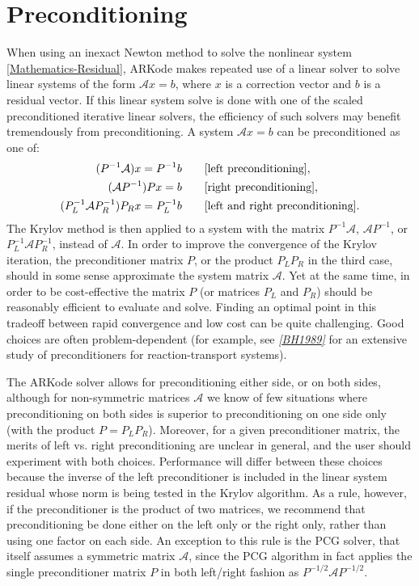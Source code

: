\documentclass[letterpaper,10pt,english]{sphinxmanual}
\begin{document}
\section{Preconditioning}
\label{Mathematics:mathematics-preconditioning}\label{Mathematics:preconditioning}
When using an inexact Newton method to solve the nonlinear system
\eqref{Mathematics-Residual}, ARKode makes repeated use of a linear solver to solve
linear systems of the form \({\mathcal A}x = b\), where \(x\) is a
correction vector and \(b\) is a residual vector.  If this linear
system solve is done with one of the scaled preconditioned iterative
linear solvers, the efficiency of such solvers may benefit
tremendously from preconditioning. A system \({\mathcal A}x=b\) can be
preconditioned as one of:
\begin{gather}
\begin{split}(P^{-1}{\mathcal A})x = P^{-1}b & \qquad\text{[left preconditioning]}, \\
({\mathcal A}P^{-1})Px = b  & \qquad\text{[right preconditioning]}, \\
(P_L^{-1} {\mathcal A} P_R^{-1}) P_R x = P_L^{-1}b & \qquad\text{[left and right
preconditioning]}.\end{split}\notag
\end{gather}
The Krylov method is then applied to a system with the
matrix \(P^{-1}{\mathcal A}\), \({\mathcal A}P^{-1}\), or
\(P_L^{-1} {\mathcal A} P_R^{-1}\), instead of \({\mathcal
A}\).  In order to improve the convergence of the Krylov iteration, the
preconditioner matrix \(P\), or the product \(P_L P_R\) in the
third case, should in some sense approximate the system matrix
\({\mathcal A}\).  Yet at the same time, in order to be
cost-effective the matrix \(P\) (or matrices \(P_L\) and
\(P_R\)) should be reasonably efficient to evaluate and solve.
Finding an optimal point in this tradeoff between rapid
convergence and low cost can be quite challenging.  Good choices are
often problem-dependent (for example, see \label{Mathematics:id6}{\hyperref[References:bh1989]{\emph{{[}BH1989{]}}}} for an
extensive study of preconditioners for reaction-transport systems).

The ARKode solver allows for preconditioning either side, or on both
sides, although for non-symmetric matrices \({\mathcal A}\) we
know of few situations where preconditioning on both sides is superior
to preconditioning on one side only (with the product \(P = P_L
P_R\)).  Moreover, for a given preconditioner matrix, the merits of left
vs. right preconditioning are unclear in general, and the user should
experiment with both choices.  Performance will differ between these
choices because the inverse of the left preconditioner is included in
the linear system residual whose norm is being tested in the Krylov
algorithm.  As a rule, however, if the preconditioner is the product
of two matrices, we recommend that preconditioning be done either on
the left only or the right only, rather than using one factor on each
side.  An exception to this rule is the PCG solver, that itself
assumes a symmetric matrix \({\mathcal A}\), since the PCG
algorithm in fact applies the single preconditioner matrix \(P\)
in both left/right fashion as \(P^{-1/2} {\mathcal A} P^{-1/2}\).
\end{document}
